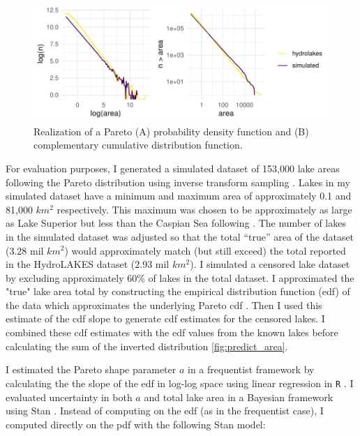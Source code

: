 \documentclass{article}
\begin{document}
\begin{figure}
	\centering
	\includegraphics{figures/pareto_demo-1}
	\caption{Realization of a Pareto (A) probability density function and (B) complementary cumulative distribution function.}
	\label{fig:pareto_demo}
\end{figure}

For evaluation purposes, I generated a simulated dataset of 153,000 lake areas following the Pareto distribution using inverse transform sampling \citep{newman_power_2005}. Lakes in my simulated dataset have a minimum and maximum area of approximately 0.1 and 81,000 $km^2$ respectively. This maximum was chosen to be approximately as large as Lake Superior but less than the Caspian Sea following \citep{lehnerDevelopmentValidationGlobal2004}. The number of lakes in the simulated dataset was adjusted so that the total “true” area of the dataset (3.28 mil $km^2$) would approximately match (but still exceed) the total reported in the HydroLAKES dataset (2.93 mil $km^2$). I simulated a censored lake dataset by excluding approximately 60\% of lakes in the total dataset. I approximated the "true" lake area total by constructing the empirical distribution function (edf) of the data which approximates the underlying Pareto cdf \citep{newman_power_2005}. Then I used this estimate of the cdf slope to generate cdf estimates for the censored lakes. I combined these cdf estimates with the edf values from the known lakes before calculating the sum of the inverted distribution \ref{fig:predict_area}.

I estimated the Pareto shape parameter $a$ in a frequentist framework by calculating the the slope of the edf in log-log space using linear regression in \texttt{R} \citep{team2013r}. I evaluated uncertainty in both $a$ and total lake area in a Bayesian framework using Stan \citep{standevelopmentteamStanModelingLanguage2017}. Instead of computing on the edf (as in the frequentist case), I computed directly on the pdf with the following Stan model:
\end{document}
